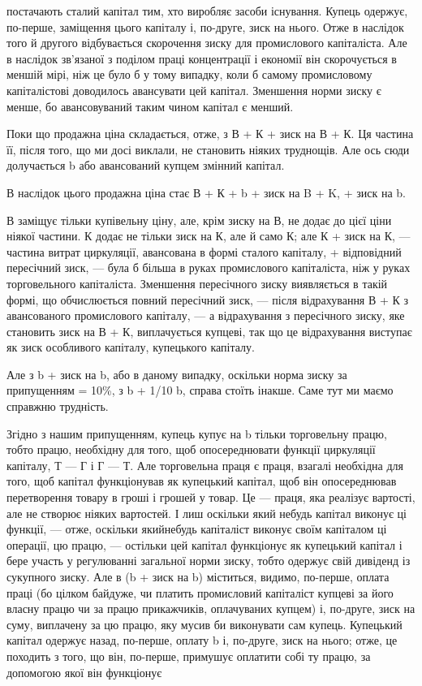 постачають сталий капітал тим, хто виробляє засоби існування.
Купець одержує, по-перше, заміщення цього капіталу і, по-друге,
зиск на нього. Отже в наслідок того й другого відбувається
скорочення зиску для промислового капіталіста. Але в наслідок
зв’язаної з поділом праці концентрації і економії він скорочується
в меншій мірі, ніж це було б у тому випадку, коли б самому
промисловому капіталістові доводилось авансувати цей капітал.
Зменшення норми зиску є менше, бо авансовуваний таким чином
капітал є менший.

Поки що продажна ціна складається, отже, з В + К + зиск на
В + К. Ця частина її, після того, що ми досі виклали, не становить
ніяких труднощів. Але ось сюди долучається b або авансований
купцем змінний капітал.

В наслідок цього продажна ціна стає В + К + b + зиск на
B + K, + зиск на b.

В заміщує тільки купівельну ціну, але, крім зиску на В, не
додає до цієї ціни ніякої частини. К додає не тільки зиск на К,
але й само К; але К + зиск на К, — частина витрат циркуляції,
авансована в формі сталого капіталу, + відповідний пересічний
зиск, — була б більша в руках промислового капіталіста, ніж у
руках торговельного капіталіста. Зменшення пересічного зиску
виявляється в такій формі, що обчислюється повний пересічний
зиск, — після відрахування В + К з авансованого промислового
капіталу, — а відрахування з пересічного зиску, яке становить
зиск на В + К, виплачується купцеві, так що це відрахування
виступає як зиск особливого капіталу, купецького капіталу.

Але з b + зиск на b, або в даному випадку, оскільки норма
зиску за припущенням = 10\%, з b + 1/10 b, справа стоїть інакше.
Саме тут ми маємо справжню трудність.

Згідно з нашим припущенням, купець купує на b тільки торговельну
працю, тобто працю, необхідну для того, щоб опосереднювати
функції циркуляції капіталу, Т — Г і Г — Т. Але торговельна
праця є праця, взагалі необхідна для того, щоб капітал
функціонував як купецький капітал, щоб він опосереднював перетворення
товару в гроші і грошей у товар. Це — праця, яка реалізує
вартості, але не створює ніяких вартостей. І лиш оскільки
який небудь капітал виконує ці функції, — отже, оскільки якийнебудь
капіталіст виконує своїм капіталом ці операції, цю працю,
— остільки цей капітал функціонує як купецький капітал
і бере участь у регулюванні загальної норми зиску, тобто одержує
свій дивіденд із сукупного зиску. Але в (b + зиск на b) міститься,
видимо, по-перше, оплата праці (бо цілком байдуже, чи платить
промисловий капіталіст купцеві за його власну працю чи за працю
прикажчиків, оплачуваних купцем) і, по-друге, зиск на суму,
виплачену за цю працю, яку мусив би виконувати сам купець.
Купецький капітал одержує назад, по-перше, оплату b і, по-друге,
зиск на нього; отже, це походить з того, що він, по-перше, примушує
оплатити собі ту працю, за допомогою якої він функціонує
